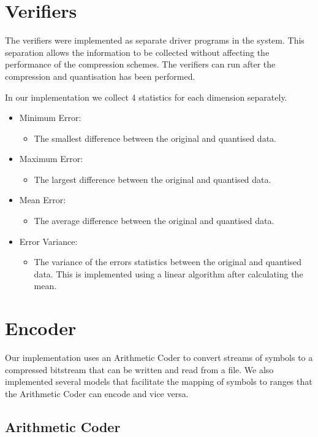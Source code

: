 \documentclass[a4paper,11pt]{report}
\begin{document}
\section{Verifiers}

The verifiers were implemented as separate driver programs in the system. This separation allows the information to be collected without affecting the performance of the compression schemes. The verifiers can run after the compression and quantisation has been performed.

In our implementation we collect 4 statistics for each dimension separately.
\begin{itemize}
 \item Minimum Error: 
 \begin{itemize}
   \item The smallest difference between the original and quantised data.
 \end{itemize}
 \item Maximum Error:
 \begin{itemize}
   \item The largest difference between the original and quantised data.
 \end{itemize}
 \item Mean Error:
 \begin{itemize}
   \item The average difference between the original and quantised data.
 \end{itemize}
 \item Error Variance:
 \begin{itemize}
   \item The variance of the errors statistics between the original and quantised data. This is implemented using a linear algorithm after calculating the mean.
 \end{itemize}
\end{itemize}


\section{Encoder}

Our implementation uses an Arithmetic Coder to convert streams of symbols to a compressed bitstream that can be written and read from a file. We also implemented several models that facilitate the mapping of symbols to ranges that the Arithmetic Coder can encode and vice versa.

\subsection{Arithmetic Coder}
\end{document}
